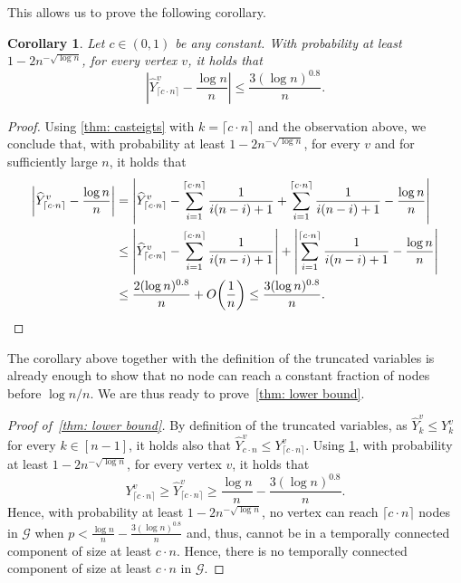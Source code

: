 \documentclass[a4paper,11pt]{article}
\theoremstyle{definition}
\theoremstyle{plain}
\newtheorem{corollary}{Corollary}
\newcommand{\GGG}{\mathcal{G}}
\newcommand{\bigO}{O} %
\begin{document}
This allows us to prove the following corollary.
\begin{corollary}\label{cor: cn}
  Let $c\in (0, 1)$ be any constant. With probability at least $1-2n^{-\sqrt{\log n}}$, for every vertex $v$, it holds that
  \[
    \left| \widehat{Y}_{\lceil c\cdot n \rceil}^v - \frac{\log n}{n}\right| \le \frac{3(\log n)^{0.8}}{n}.
  \]
\end{corollary}
\begin{proof}
    Using \cref{thm: casteigts} with $k=\lceil c\cdot n \rceil$ and the observation above,
    we conclude that, with probability at least $1-2n^{-\sqrt{\log n}}$, for every $v$ and for sufficiently large $n$, it holds that
    \begin{align*}
	    \left| \widehat{Y}_{\lceil c\cdot n \rceil}^v - \frac{\log n}{n}\right|
	    &=\left| \widehat{Y}_{\lceil c\cdot n \rceil}^v - \sum_{i=1}^{\lceil c\cdot n \rceil} \frac{1}{i(n-i)+1} + \sum_{i=1}^{\lceil c\cdot n \rceil} \frac{1}{i(n-i)+1}
	    - \frac{\log n}{n} \right|\\
	    &\le \left| \widehat{Y}_{\lceil c\cdot n \rceil}^v - \sum_{i=1}^{\lceil c\cdot n \rceil} \frac{1}{i(n-i)+1}\right|
	    + \left| \sum_{i=1}^{\lceil c\cdot n \rceil}\frac{1}{i(n-i) + 1} - \frac{\log n}{n} \right| \\
	    &\le\frac{2 (\log n)^{0.8}}{n}
	    + \bigO\mathopen{}\left(\frac{1}{n}\right)
	    \le \frac{3 (\log n)^{0.8}}{n}.\qedhere
    \end{align*}
\end{proof}
The corollary above together with the definition of the truncated variables is already enough to show that no node can reach a constant fraction of nodes before $\log n / n$. We are thus ready to prove~\cref{thm: lower bound}.
\begin{proof}[Proof of~\cref{thm: lower bound}]
    By definition of the truncated variables, as $\widehat{Y}_{k}^v\leq Y_{k}^v$ for every $k\in [n-1]$, it holds also that $\widehat{Y}_{c\cdot n}^v\leq Y_{\lceil c\cdot n \rceil}^v$.
    Using \cref{cor: cn}, with probability at least $1-2n^{-\sqrt{\log n}}$, for every vertex $v$, it holds that
    \[
        Y_{\lceil c\cdot n \rceil}^v
        \geq \widehat{Y}_{\lceil c\cdot n \rceil}^v
        \geq\frac{\log n}{n}-\frac{3(\log n)^{0.8}}{n}.
    \]
    Hence, with probability at least $1-2n^{-\sqrt{\log n}}$,
    no vertex can reach $\lceil c\cdot n \rceil$ nodes
    in $\GGG$ when $p<\frac{\log n}{n}-\frac{3(\log n)^{0.8}}{n}$ and, thus, cannot be in a temporally connected component of size at least $c\cdot n$. Hence, there is no temporally connected component of size at least $c\cdot n $ in $\GGG$.
\end{proof}
\end{document}
